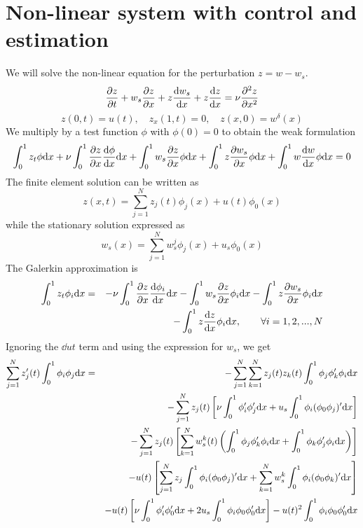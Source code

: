 \documentclass[12pt]{article}
\begin{document}
\section{Non-linear system with control and estimation}
We will solve the non-linear equation for the perturbation $z = w - w_s$.
\begin{equation*}
\frac{\partial z}{\partial t} + w_s \frac{\partial z}{\partial x} + z \frac{\textrm{d} w_s}{\textrm{d} x} + z \frac{\textrm{d} z}{\textrm{d} x} = \nu \frac{\partial ^2 z}{\partial x^2}
\end{equation*}
\begin{equation*}
z(0,t) = u(t), \quad z_x(1,t) = 0,  \quad z(x,0) = w^\delta(x)
\end{equation*}
We multiply by a test function $\phi$ with $\phi(0)=0$ to obtain the weak formulation
\[
\int_0^1 z_t \phi \textrm{d} x + \nu \int_0^1 \frac{\partial z}{\partial x} \frac{\textrm{d} \phi}{\textrm{d} x} \textrm{d} x + \int_0^1 w_s \frac{\partial z}{\partial x} \phi \textrm{d} x + \int_0^1 z \frac{\partial w_s}{\partial x} \phi \textrm{d} x + \int_0^1 w \frac{\textrm{d} w}{\textrm{d} x} \phi \textrm{d} x = 0
\]
The finite element solution can be written as
\[
z(x,t) = \sum_{j=1}^N z_j(t) \phi_j(x) + u(t) \phi_0(x)
\]
while the stationary solution expressed as
\[
w_s(x) = \sum_{j=1}^N w_s^j \phi_j(x) + u_s \phi_0(x)
\]
The Galerkin approximation is
\begin{eqnarray*}
\int_0^1 z_t \phi_i \textrm{d} x &=& - \nu \int_0^1 \frac{\partial z}{\partial x} \frac{\textrm{d} \phi_i}{\textrm{d} x} \textrm{d} x - \int_0^1 w_s \frac{\partial z}{\partial x} \phi_i \textrm{d} x - \int_0^1 z \frac{\partial w_s}{\partial x} \phi_i \textrm{d} x \\
&& - \int_0^1 z \frac{\textrm{d} z}{\textrm{d} x} \phi_i \textrm{d} x, \qquad \forall i=1,2,...,N
\end{eqnarray*}
Ignoring the $\dd{u}{t}$ term and using the expression for $w_s$, we get
\begin{eqnarray*}
\sum_{j=1}^N z_j'(t) \int_0^1 \phi_i \phi_j \textrm{d} x &=& - \sum_{j=1}^N \sum_{k=1}^N z_j(t) z_k(t) \int_0^1 \phi_j \phi_k' \phi_i  \textrm{d} x \\ 
&& - \sum_{j=1}^N z_j(t) \left [ \nu  \int_0^1 \phi_i' \phi_j' \textrm{d} x + u_s \int_0^1 \phi_i (\phi_0 \phi_j)' \textrm{d} x  \right ] \\
&& - \sum_{j=1}^N z_j(t) \left [  \sum_{k=1}^N w_s^k(t) \left ( \int_0^1 \phi_j \phi_k' \phi_i \textrm{d} x +  \int_0^1 \phi_k \phi_j' \phi_i \textrm{d} x \right ) \right]\\
&& - u(t) \left [\sum_{j=1}^N z_j \int_0^1 \phi_i (\phi_0 \phi_j)' \textrm{d} x  + \sum_{k=1}^N w_s^k \int_0^1 \phi_i (\phi_0 \phi_k)' \textrm{d} x \right ]\\
&& -  u(t) \left[ \nu \int_0^1 \phi_i' \phi_0' \textrm{d} x + 2 u_s \int_0^1 \phi_i \phi_0 \phi_0' \textrm{d} x \right] - u(t)^2 \int_0^1 \phi_i \phi_0 \phi_0' \textrm{d} x
\end{eqnarray*}
\end{document}
